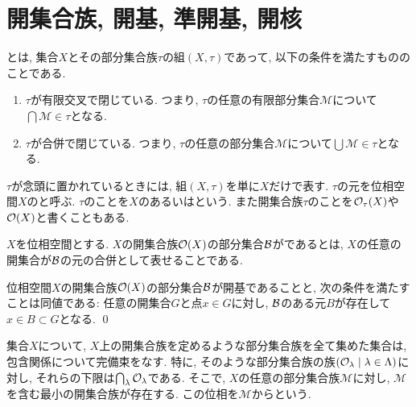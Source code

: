 \documentclass[uplatex, dvipdfmx, a4paper, 12pt, class=jsbook, crop=false]{standalone}
\begin{document}
\section{開集合族, 開基, 準開基, 開核}
\label{sec:open-sets}

\newcommand{\cM}{\mathcal{M}}

\begin{definition}
	とは, 集合$X$とその部分集合族$\tau$の組$(X, \tau)$であって, 以下の条件を満たすもののことである.
	\begin{enumerate}
		\item$\tau$が有限交叉で閉じている.
			つまり, $\tau$の任意の有限部分集合$\mathscr{M}$について$\bigcap \mathscr{M} \in \tau$となる.
		\item$\tau$が合併で閉じている.
			つまり, $\tau$の任意の部分集合$\mathscr{M}$について$\bigcup \mathscr{M} \in \tau$となる.
	\end{enumerate}
	$\tau$が念頭に置かれているときには, 組$(X, \tau)$を単に$X$だけで表す.
	$\tau$の元を位相空間$X$のと呼ぶ.
	$\tau$のことを$X$のあるいはという.
	また開集合族$\tau$のことを$\topopens_\tau (X)$や$\topopens[X]$と書くこともある.
\end{definition}

\begin{definition}
	$X$を位相空間とする.
	$X$の開集合族$\topopens[X]$の部分集合$\mathcal{B}$がであるとは, $X$の任意の開集合が$\mathcal{B}$の元の合併として表せることである.
\end{definition}

\begin{proposition}
	位相空間$X$の開集合族$\topopens[X]$の部分集合$\mathcal{B}$が開基であることと, 次の条件を満たすことは同値である: 任意の開集合$G$と点$x \in G$に対し, $\mathcal{B}$のある元$B$が存在して$x \in B \subset G$となる.
	\qed
\end{proposition}

\begin{definition}
	集合$X$について, $X$上の開集合族を定めるような部分集合族を全て集めた集合は, 包含関係について完備束をなす.
	特に, そのような部分集合族の族$\setfamily{\topopens_\lambda}{\lambda \in \Lambda}$に対し, それらの下限は$\bigcap_\lambda \topopens_\lambda$である.
	そこで, $X$の任意の部分集合族$\cM$に対し, $\cM$を含む最小の開集合族が存在する.
	この位相を$\cM$からという.
\end{definition}
\end{document}
